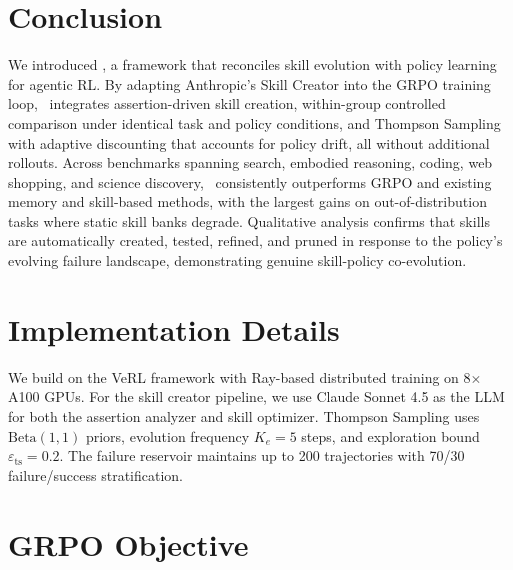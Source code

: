 \documentclass{article}
\theoremstyle{plain}
\theoremstyle{definition}
\theoremstyle{remark}
\begin{document}
\section{Conclusion}
\label{sec:conclusion}

We introduced \ours, a framework that reconciles skill evolution with policy learning for agentic RL. By adapting Anthropic's Skill Creator into the GRPO training loop, \ours~integrates assertion-driven skill creation, within-group controlled comparison under identical task and policy conditions, and Thompson Sampling with adaptive discounting that accounts for policy drift, all without additional rollouts. Across benchmarks spanning search, embodied reasoning, coding, web shopping, and science discovery, \ours~consistently outperforms GRPO and existing memory and skill-based methods, with the largest gains on out-of-distribution tasks where static skill banks degrade. Qualitative analysis confirms that skills are automatically created, tested, refined, and pruned in response to the policy's evolving failure landscape, demonstrating genuine skill-policy co-evolution.





\appendix

\section{Implementation Details}
\label{app:implementation}

We build on the VeRL framework \citep{sheng2025hybridflow} with Ray-based distributed training on 8$\times$A100 GPUs. For the skill creator pipeline, we use Claude Sonnet 4.5 as the LLM for both the assertion analyzer and skill optimizer. Thompson Sampling uses $\text{Beta}(1,1)$ priors, evolution frequency $K_e = 5$ steps, and exploration bound $\varepsilon_{\text{ts}} = 0.2$. The failure reservoir maintains up to 200 trajectories with 70/30 failure/success stratification.


\section{GRPO Objective}
\label{app:grpo}
\end{document}
